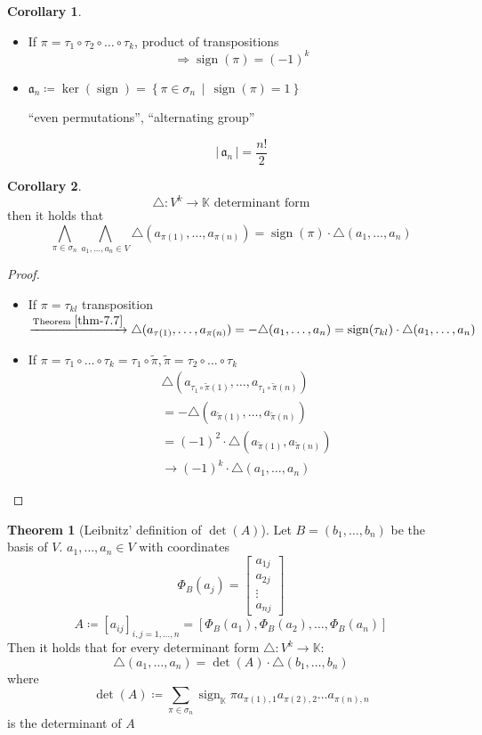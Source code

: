 \documentclass[a4paper,landscape,twocolumn]{article}
\newcommand\setdef[2]{\left\{#1\,\middle|\,#2\right\}}
\newcommand\card[1]{\left|\,#1\,\right|}
\theoremstyle{definition}
\newtheorem{theorem}{Theorem}
\newtheorem{cor}{Corollary}
\DeclareMathOperator\sign{sign}
\begin{document}
\begin{cor}
  \label{cor-7.18}
  \begin{itemize}
    \item If $\pi = \tau_1 \circ \tau_2 \circ \ldots \circ \tau_k$, product of transpositions
      \[ \Rightarrow \sign(\pi) = (-1)^k \]
    \item $\mathfrak a_n \coloneqq \ker(\sign) = \setdef{\pi \in \sigma_n}{\sign(\pi) = 1}$
      \begin{center} \enquote{even permutations}, \enquote{alternating group} \end{center}
      \[ \card{\mathfrak a_n} = \frac{n!}{2} \]
  \end{itemize}
\end{cor}
\begin{cor}
  \label{cor-7.19}
  \[ \triangle: V^k \to \mathbb K \text{ determinant form} \]
  then it holds that
  \[
    \bigwedge_{\pi \in \sigma_n} \bigwedge_{a_1, \ldots, a_n \in V}
    \triangle(a_{\pi(1)}, \ldots, a_{\pi(n)}) = \sign(\pi) \cdot \triangle(a_1, \ldots, a_n)
  \]
\end{cor}
\begin{proof}
  \begin{itemize}
    \item If $\pi = \tau_{kl}$ transposition $\xrightarrow{\text{Theorem~}\ref{thm-7.7}} \triangle(a_{\tau(1)}, \ldots, a_{\pi(n)})
      = -\triangle(a_1, \ldots, a_n) = \sign(\tau_{kl}) \cdot \triangle(a_1, \ldots, a_n)$
    \item If $\pi = \tau_1 \circ \ldots \circ \tau_k = \tau_1 \circ \tilde{\pi}, \tilde{\pi} = \tau_2 \circ \ldots \circ \tau_k$
      \begin{align*}
        &\triangle(a_{\tau_1 \circ \tilde{\pi}(1)}, \ldots, a_{\tau_1 \circ \tilde{\pi}(n)}) \\
        &= -\triangle(a_{\tilde\pi(1)}, \ldots, a_{\tilde\pi(n)}) \\
        &= (-1)^2 \cdot \triangle(a_{\tilde\pi(1)}, a_{\tilde\pi(n)}) \\
        &\to (-1)^k \cdot \triangle(a_1, \ldots, a_n)
      \end{align*}
  \end{itemize}
\end{proof}
\begin{theorem}[Leibnitz' definition of $\det(A)$]
  \label{satz-7.20}
  Let $B = (b_1, \ldots, b_n)$ be the basis of $V$. $a_1, \ldots, a_n \in V$ with coordinates
  \[ \Phi_B(a_j) = \begin{bmatrix} a_{1j} \\ a_{2j} \\ \vdots \\ a_{nj} \end{bmatrix} \]
  \[ A \coloneqq [a_{ij}]_{i,j=1,\ldots,n} = \left[\Phi_B(a_1), \Phi_B(a_2), \ldots, \Phi_B(a_n)\right] \]
  Then it holds that for every determinant form $\triangle: V^k \to \mathbb K$:
  \[ \triangle(a_1, \ldots, a_n) = \det(A) \cdot \triangle(b_1, \ldots, b_n) \]
  where
  \[ \det(A) \coloneqq \sum_{\pi \in \sigma_n} \sign_{\mathbb K} \pi a_{\pi(1),1} a_{\pi(2),2} \ldots a_{\pi(n),n} \]
  is the determinant of $A$
\end{theorem}
\end{document}
